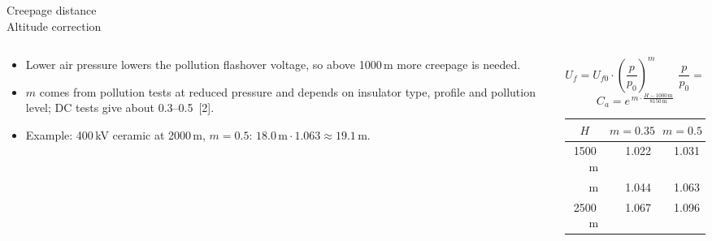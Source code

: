 \begin{frame}{Creepage distance\\Altitude correction}
  \begin{columns}[T,onlytextwidth]
    \begin{column}{0.48\textwidth}
      {\small
      \begin{itemize}
        \setlength{\itemsep}{0.4em}
        \item Lower air pressure lowers the pollution flashover voltage, so
              above 1000\,m more creepage is needed.
        \item $m$ comes from pollution tests at reduced pressure and depends
              on insulator type, profile and pollution level; DC tests give
              about 0.3--0.5~[2].
        \item Example: 400\,kV ceramic at 2000\,m, $m=0.5$:
              $18.0\,\mathrm{m} \cdot 1.063 \approx 19.1\,\mathrm{m}$.
      \end{itemize}}
    \end{column}
    \begin{column}{0.48\textwidth}\centering
      \setlength{\abovedisplayskip}{3pt}\setlength{\belowdisplayskip}{3pt}
      \[ U_{f} = U_{f0} \cdot \left(\frac{p}{p_{0}}\right)^{m}
         \qquad \frac{p}{p_{0}} = e^{-H/8150\,\mathrm{m}} \]
      \[ C_{a} = e^{\,m \cdot \frac{H-1000\,\mathrm{m}}{8150\,\mathrm{m}}} \]
      \vspace{0.3em}
      {\small
      \renewcommand{\arraystretch}{1.2}
      \begin{tabular}{@{}r r r@{}}
        \toprule
        \multicolumn{1}{c}{\textbf{$H$}} & \multicolumn{1}{c}{\textbf{$m=0.35$}}
                                       & \multicolumn{1}{c}{\textbf{$m=0.5$}} \\
        \midrule
        1500\,m & 1.022 & 1.031 \\
        \atrowfill
        2000\,m & 1.044 & 1.063 \\
        2500\,m & 1.067 & 1.096 \\
        \bottomrule
      \end{tabular}}
    \end{column}
  \end{columns}
\end{frame}

